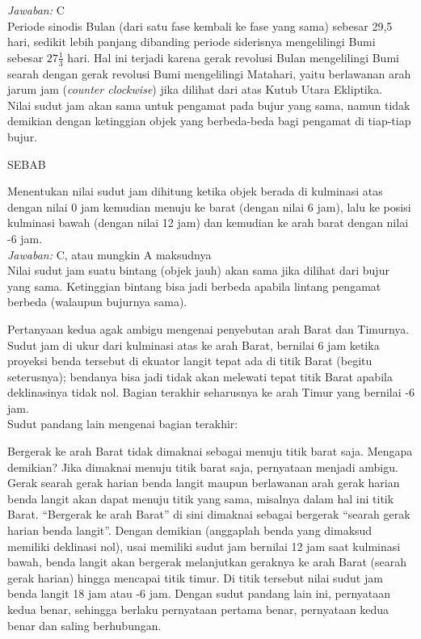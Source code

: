 \documentclass[11pt,fleqn]{exam}
\begin{document}
\begin{questions}
\textit{Jawaban: } C\\

Periode sinodis Bulan (dari satu fase kembali ke fase yang sama) sebesar 29,5 hari, sedikit lebih panjang dibanding periode siderisnya mengelilingi Bumi sebesar $27\frac{1}{3}$ hari. Hal ini terjadi karena gerak revolusi Bulan mengelilingi Bumi searah dengan gerak revolusi Bumi mengelilingi Matahari, yaitu berlawanan arah jarum jam (\textit{counter clockwise}) jika dilihat dari atas Kutub Utara Ekliptika.\\


\question Nilai sudut jam akan sama untuk pengamat pada bujur yang sama, namun tidak demikian dengan ketinggian objek yang berbeda-beda bagi pengamat di tiap-tiap bujur.
\begin{center}
SEBAB
\end{center}
Menentukan nilai sudut jam dihitung ketika objek berada di kulminasi atas dengan nilai 0 jam kemudian menuju ke barat (dengan nilai 6 jam), lalu ke posisi kulminasi bawah (dengan nilai 12 jam) dan kemudian ke arah barat dengan nilai -6 jam.\\

\textit{Jawaban: } C, atau mungkin A maksudnya\\

Nilai sudut jam suatu bintang (objek jauh) akan sama jika dilihat dari bujur yang sama. Ketinggian bintang bisa jadi berbeda apabila lintang pengamat berbeda (walaupun bujurnya sama).

Pertanyaan kedua agak ambigu mengenai penyebutan arah Barat dan Timurnya. Sudut jam di ukur dari kulminasi atas ke arah Barat, bernilai 6 jam ketika proyeksi benda tersebut di ekuator langit tepat ada di titik Barat (begitu seterusnya); bendanya bisa jadi tidak akan melewati tepat titik Barat apabila deklinasinya tidak nol. Bagian terakhir seharusnya ke arah Timur yang bernilai -6 jam.\\

Sudut pandang lain mengenai bagian terakhir:

Bergerak ke arah Barat tidak dimaknai sebagai menuju titik barat saja. Mengapa demikian? Jika dimaknai menuju titik barat saja, pernyataan menjadi ambigu. Gerak searah gerak harian benda langit maupun berlawanan arah gerak harian benda langit akan dapat menuju titik yang sama, misalnya dalam hal ini titik Barat. ``Bergerak ke arah Barat'' di sini dimaknai sebagai bergerak ``searah gerak harian benda langit''. Dengan demikian (anggaplah benda yang dimaksud memiliki deklinasi nol), usai memiliki sudut jam bernilai 12 jam saat kulminasi bawah, benda langit akan bergerak melanjutkan geraknya ke arah Barat (searah gerak harian) hingga mencapai titik timur. Di titik tersebut nilai sudut jam benda langit 18 jam atau -6 jam. Dengan sudut pandang lain ini, pernyataan kedua benar, sehingga berlaku pernyataan pertama benar, pernyataan kedua benar dan saling berhubungan.\\



\end{questions}
\end{document}
